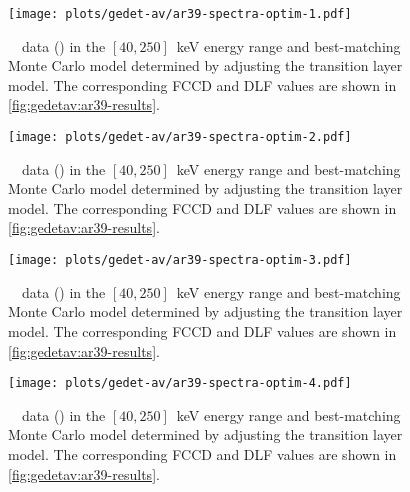 \begin{figure}
  \centering
  \texttt{[image: plots/gedet-av/ar39-spectra-optim-1.pdf]}
  \caption{%
    \gerda\ \phasetwop\ data (\gexpophasetwopbkg) in the $[40, 250]$~keV energy range and
    best-matching Monte Carlo model determined by adjusting the transition layer model.
    The corresponding FCCD and DLF values are shown in \cref{fig:gedetav:ar39-results}.
  }\label{fig:gedetav:spectra-optim-1}
\end{figure}

\begin{figure}
  \centering
  \texttt{[image: plots/gedet-av/ar39-spectra-optim-2.pdf]}
  \caption{%
    \gerda\ \phasetwop\ data (\gexpophasetwopbkg) in the $[40, 250]$~keV energy range and
    best-matching Monte Carlo model determined by adjusting the transition layer model.
    The corresponding FCCD and DLF values are shown in \cref{fig:gedetav:ar39-results}.
  }\label{fig:gedetav:spectra-optim-2}
\end{figure}

\begin{figure}
  \centering
  \texttt{[image: plots/gedet-av/ar39-spectra-optim-3.pdf]}
  \caption{%
    \gerda\ \phasetwop\ data (\gexpophasetwopbkg) in the $[40, 250]$~keV energy range and
    best-matching Monte Carlo model determined by adjusting the transition layer model.
    The corresponding FCCD and DLF values are shown in \cref{fig:gedetav:ar39-results}.
  }\label{fig:gedetav:spectra-optim-3}
\end{figure}

\begin{figure}
  \centering
  \texttt{[image: plots/gedet-av/ar39-spectra-optim-4.pdf]}
  \caption{%
    \gerda\ \phasetwop\ data (\gexpophasetwopbkg) in the $[40, 250]$~keV energy range and
    best-matching Monte Carlo model determined by adjusting the transition layer model.
    The corresponding FCCD and DLF values are shown in \cref{fig:gedetav:ar39-results}.
  }\label{fig:gedetav:spectra-optim-4}
\end{figure}

